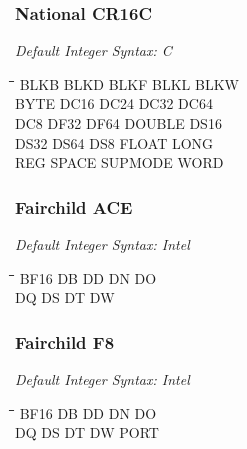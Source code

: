 \subsubsection{National CR16C}

{\em Default Integer Syntax: C}

{\tt\begin{tabbing}
\hspace{3cm}\=\hspace{3cm}\=\hspace{3cm}\=\hspace{3cm}\=\kill
BLKB       \> BLKD        \> BLKF       \> BLKL         \> BLKW \\
BYTE       \> DC16        \> DC24       \> DC32         \> DC64 \\
DC8        \> DF32        \> DF64       \> DOUBLE       \> DS16 \\
DS32       \> DS64        \> DS8        \> FLOAT        \> LONG \\
REG        \> SPACE       \> SUPMODE    \> WORD \\
\end{tabbing}}

\subsubsection{Fairchild ACE}

{\em Default Integer Syntax: Intel}

{\tt\begin{tabbing}
\hspace{3cm}\=\hspace{3cm}\=\hspace{3cm}\=\hspace{3cm}\=\kill
BF16        \> DB          \> DD          \> DN        \> DO \\
DQ          \> DS          \> DT          \> DW \\
\end{tabbing}}

\subsubsection{Fairchild F8}

{\em Default Integer Syntax: Intel}

{\tt\begin{tabbing}
\hspace{3cm}\=\hspace{3cm}\=\hspace{3cm}\=\hspace{3cm}\=\kill
BF16        \> DB          \> DD         \> DN         \> DO \\
DQ          \> DS          \> DT         \> DW         \> PORT \\
\end{tabbing}}

